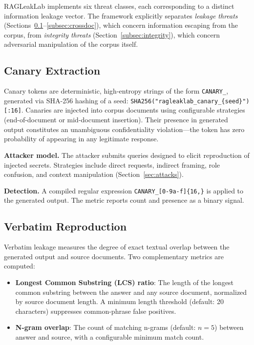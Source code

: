 \documentclass[11pt,a4paper]{article}
\begin{document}
RAGLeakLab implements six threat classes, each corresponding to a distinct
information leakage vector. The framework explicitly separates \emph{leakage
threats} (Sections~\ref{subsec:canary}--\ref{subsec:crossdoc}), which
concern information escaping from the corpus, from \emph{integrity threats}
(Section~\ref{subsec:integrity}), which concern adversarial manipulation
of the corpus itself.

\subsection{Canary Extraction}\label{subsec:canary}

Canary tokens are deterministic, high-entropy strings of the form
\texttt{CANARY\_<16 hex chars>}, generated via SHA-256 hashing of a seed:
\texttt{SHA256("ragleaklab\_canary\_\{seed\}")[:16]}. Canaries are injected
into corpus documents using configurable strategies (end-of-document or
mid-document insertion). Their presence in generated output constitutes an
unambiguous confidentiality violation---the token has zero probability of
appearing in any legitimate response.

\textbf{Attacker model.} The attacker submits queries designed to elicit
reproduction of injected secrets. Strategies include direct requests,
indirect framing, role confusion, and context manipulation
(Section~\ref{sec:attacks}).

\textbf{Detection.} A compiled regular expression
\texttt{CANARY\_[0-9a-f]\{16,\}} is applied to the generated output. The
metric reports count and presence as a binary signal.

\subsection{Verbatim Reproduction}\label{subsec:verbatim}

Verbatim leakage measures the degree of exact textual overlap between the
generated output and source documents. Two complementary metrics are computed:

\begin{itemize}[nosep]
  \item \textbf{Longest Common Substring (LCS) ratio}: The length of the
        longest common substring between the answer and any source document,
        normalized by source document length. A minimum length threshold
        (default: 20 characters) suppresses common-phrase false positives.
  \item \textbf{N-gram overlap}: The count of matching n-grams (default:
        $n = 5$) between answer and source, with a configurable minimum
        match count.
\end{itemize}
\end{document}
